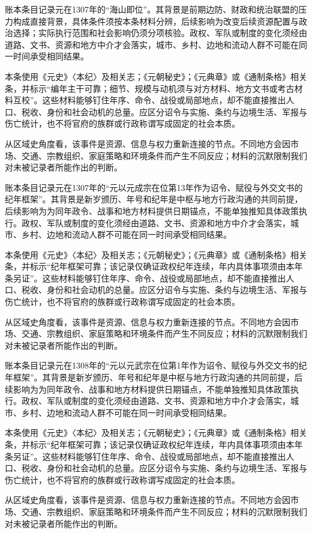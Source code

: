 账本条目记录元在1307年的“海山即位”。其背景是前期边防、财政和统治联盟的压力构成直接背景，具体条件须按本条材料分辨，后续影响为改变后续资源配置与政治选择；实际执行范围和社会影响仍须分项核验。政权、军队或制度的变化须经由道路、文书、资源和地方中介才会落实，城市、乡村、边地和流动人群不可能在同一时间承受相同结果。

本条使用《元史》〈本纪〉及相关志；《元朝秘史》；《元典章》或《通制条格》相关条，并标示“编年主干可靠；细节、规模与动机须与对方材料、地方文书或考古材料互校”。这些材料能够钉住年序、命令、战役或局部地点，却不能直接推出人口、税收、身份和社会动机的总量。应区分诏令与实施、条约与边境生活、军报与伤亡统计，也不将官府的族群或行政称谓写成固定的社会本质。

从区域史角度看，该事件是资源、信息与权力重新连接的节点。不同地方会因市场、交通、宗教组织、家庭策略和环境条件而产生不同反应；材料的沉默限制我们对未被记录者所能作出的判断。

账本条目记录元在1307年的“元以元成宗在位第13年作为诏令、赋役与外交文书的纪年框架”。其背景是新岁颁历、年号和纪年是中枢与地方行政沟通的共同前提，后续影响为为同年政令、战事和地方材料提供日期锚点，不能单独推知具体政策执行。政权、军队或制度的变化须经由道路、文书、资源和地方中介才会落实，城市、乡村、边地和流动人群不可能在同一时间承受相同结果。

本条使用《元史》〈本纪〉及相关志；《元朝秘史》；《元典章》或《通制条格》相关条，并标示“纪年框架可靠；该记录仅确证政权纪年连续，年内具体事项须由本年条另证”。这些材料能够钉住年序、命令、战役或局部地点，却不能直接推出人口、税收、身份和社会动机的总量。应区分诏令与实施、条约与边境生活、军报与伤亡统计，也不将官府的族群或行政称谓写成固定的社会本质。

从区域史角度看，该事件是资源、信息与权力重新连接的节点。不同地方会因市场、交通、宗教组织、家庭策略和环境条件而产生不同反应；材料的沉默限制我们对未被记录者所能作出的判断。

账本条目记录元在1308年的“元以元武宗在位第1年作为诏令、赋役与外交文书的纪年框架”。其背景是新岁颁历、年号和纪年是中枢与地方行政沟通的共同前提，后续影响为为同年政令、战事和地方材料提供日期锚点，不能单独推知具体政策执行。政权、军队或制度的变化须经由道路、文书、资源和地方中介才会落实，城市、乡村、边地和流动人群不可能在同一时间承受相同结果。

本条使用《元史》〈本纪〉及相关志；《元朝秘史》；《元典章》或《通制条格》相关条，并标示“纪年框架可靠；该记录仅确证政权纪年连续，年内具体事项须由本年条另证”。这些材料能够钉住年序、命令、战役或局部地点，却不能直接推出人口、税收、身份和社会动机的总量。应区分诏令与实施、条约与边境生活、军报与伤亡统计，也不将官府的族群或行政称谓写成固定的社会本质。

从区域史角度看，该事件是资源、信息与权力重新连接的节点。不同地方会因市场、交通、宗教组织、家庭策略和环境条件而产生不同反应；材料的沉默限制我们对未被记录者所能作出的判断。
